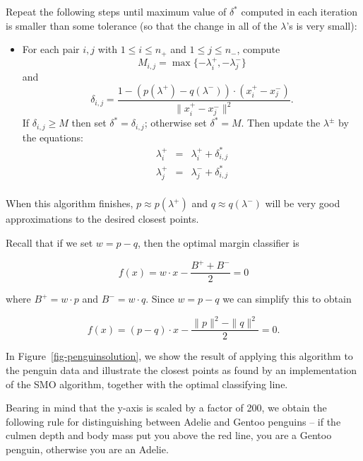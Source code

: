 \documentclass[
  11pt,
  letterpaper,
]{scrbook}
\providecommand{\tightlist}{%
  \setlength{\itemsep}{0pt}\setlength{\parskip}{0pt}}\usepackage{longtable,booktabs,array}
\theoremstyle{plain}
\theoremstyle{plain}
\theoremstyle{remark}
\begin{document}
Repeat the following steps until maximum value of \(\delta^{*}\)
computed in each iteration is smaller than some tolerance (so that the
change in all of the \(\lambda\)'s is very small):

\begin{itemize}
\tightlist
\item
  For each pair \(i,j\) with \(1\le i\le n_{+}\) and
  \(1\le j\le n_{-}\), compute \[
  M_{i,j} = \max\{-\lambda_{i}^{+},-\lambda_{j}^{-}\}
  \] and \[
  \delta_{i,j} = \frac{1-(p(\lambda^{+})-q(\lambda^{-}))\cdot(x_{i}^{+}-x_{j}^{-})}{\|x^+_{i}-x^{-}_{j}\|^2}.
  \] If \(\delta_{i,j}\ge M\) then set \(\delta^{*}=\delta_{i,j}\);
  otherwise set \(\delta^{*}=M\). Then update the \(\lambda^{\pm}\) by
  the equations: \[
  \begin{aligned}
  \lambda^{+}_{i}&=&\lambda^{+}_{i}+\delta_{i,j}^{*} \\
  \lambda^{+}_{j}&=&\lambda^{-}_{j}+\delta_{i,j}^{*} \\
  \end{aligned}
  \]
\end{itemize}

When this algorithm finishes, \(p\approx p(\lambda^{+})\) and
\(q\approx q(\lambda^{-})\) will be very good approximations to the
desired closest points.

Recall that if we set \(w=p-q\), then the optimal margin classifier is

\[
f(x)=w\cdot x - \frac{B^{+}+B^{-}}{2}=0
\]

where \(B^{+}=w\cdot p\) and \(B^{-}=w\cdot q\). Since \(w=p-q\) we can
simplify this to obtain

\[
f(x)=(p-q)\cdot x -\frac{\|p\|^2-\|q\|^2}{2}=0.
\]

In Figure~\ref{fig-penguinsolution}, we show the result of applying this
algorithm to the penguin data and illustrate the closest points as found
by an implementation of the SMO algorithm, together with the optimal
classifying line.

Bearing in mind that the y-axis is scaled by a factor of 200, we obtain
the following rule for distinguishing between Adelie and Gentoo penguins
-- if the culmen depth and body mass put you above the red line, you are
a Gentoo penguin, otherwise you are an Adelie.
\end{document}
